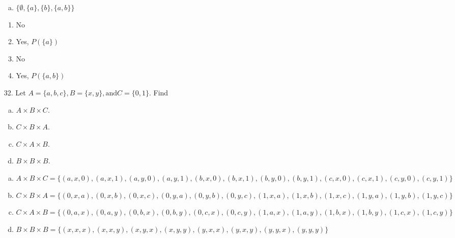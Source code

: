 \begin{itemize}
\begin{enumerate}[a.]
            \item $\{\emptyset, \{a\}, \{b\}, \{a, b\}\}$
         \end{enumerate}
         \answer
         \begin{enumerate}
            \item No
            \item Yes, $P(\{a\})$
            \item No
            \item Yes, $P(\{a, b\})$
         \end{enumerate}
   \item [32.] Let $A = \{a, b, c\}, B = \{x, y\}, \text{and} C = \{0, 1\}$. Find
         \begin{enumerate}[a.]
            \item $A \times B \times C$.
            \item $C \times B \times A$.
            \item $C \times A \times B$.
            \item $B \times B \times B$.
         \end{enumerate}
         \answer
         \begin{enumerate}[a.]
            \item $A \times B \times C = \{(a, x, 0), (a, x, 1), (a, y, 0), (a, y, 1), (b, x, 0), (b, x, 1), (b, y, 0), (b, y, 1), (c, x, 0), (c, x, 1), (c, y, 0), (c, y, 1)\}$
            \item $C \times B \times A = \{(0, x, a), (0, x, b), (0, x, c), (0, y, a), (0, y, b), (0, y, c), (1, x, a), (1, x, b), (1, x, c), (1, y, a), (1, y, b), (1, y, c)\}$
            \item $C \times A \times B = \{(0, a, x), (0, a, y), (0, b, x), (0, b, y), (0, c, x), (0, c, y), (1, a, x), (1, a, y), (1, b, x), (1, b, y), (1, c, x), (1, c, y)\}$
            \item $B \times B \times B = \{(x, x, x), (x, x, y), (x, y, x), (x, y, y), (y, x, x), (y, x, y), (y, y, x), (y, y, y)\}$
         \end{enumerate}
\end{itemize}

